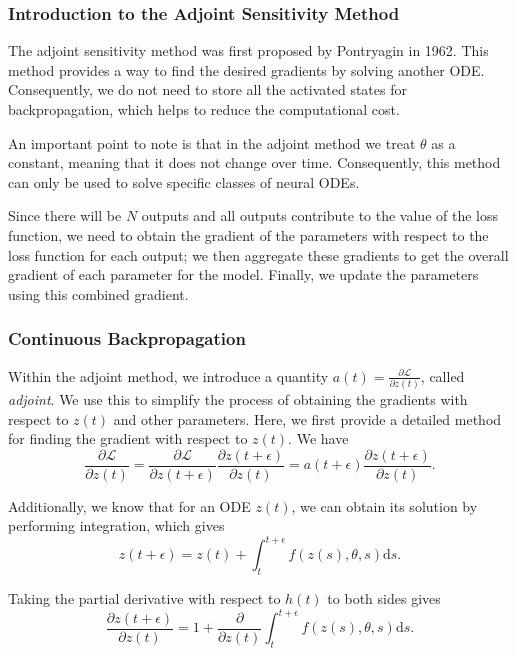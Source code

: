\documentclass[a4paper,11pt,titlepage]{article}
\theoremstyle{definition}
\theoremstyle{plain}
\theoremstyle{remark}
\begin{document}
\subsubsection{Introduction to the Adjoint Sensitivity Method}

The adjoint sensitivity method was first proposed by Pontryagin in 1962. This method provides a way to find the desired gradients by solving another ODE. Consequently, we do not need to store all the activated states for backpropagation, which helps to reduce the computational cost. 

An important point to note is that in the adjoint method we treat $\theta$ as a constant, meaning that it does not change over time. Consequently, this method can only be used to solve specific classes of neural ODEs.

Since there will be $N$ outputs and all outputs contribute to the value of the loss function, we need to obtain the gradient of the parameters with respect to the loss function for each output; we then aggregate these gradients to get the overall gradient of each parameter for the model. Finally, we update the parameters using this combined gradient.

\subsubsection{Continuous Backpropagation}

Within the adjoint method, we introduce a quantity $a(t) = \frac{\partial \mathcal{L}}{\partial z(t)}$, called \textit{adjoint}. We use this to simplify the process of obtaining the gradients with respect to $z(t)$ and other parameters. Here, we first provide a detailed method for finding the gradient with respect to $z(t)$. We have
\begin{equation}\label{eq3}
    \frac{\partial \mathcal{L}}{\partial z(t)} = \frac{\partial \mathcal{L}}{\partial z(t+\epsilon)}\frac{\partial z(t+\epsilon)}{\partial z(t)}=a(t+\epsilon)\frac{\partial z(t+\epsilon)}{\partial z(t)}.\tag{3}
\end{equation}

Additionally, we know that for an ODE $z(t)$, we can obtain its solution by performing integration, which gives
$$
z(t+\epsilon) = z(t)+\int_{t}^{t+\epsilon}f(z(s),\theta,s)\mathrm{d}s.
$$

Taking the partial derivative with respect to $h(t)$ to both sides gives
\begin{equation}\label{eq4}
\frac{\partial z(t+\epsilon)}{\partial z(t)} = 1+\frac{\partial}{\partial z(t)}\int_{t}^{t+\epsilon}f(z(s),\theta,s)\mathrm{d}s.\tag{4}
\end{equation}
\end{document}
